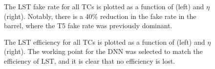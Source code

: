 \begin{figure}[!htb]
    \centering
    \qquad
    \caption{
        The LST fake rate for all TCs is plotted as a function of \pt (left) and $\eta$ (right).
        Notably, there is a 40\% reduction in the fake rate in the barrel, where the T5 fake rate was previously dominant.
    }
  \label{fig:t5dnn_fkr}
\end{figure}

\begin{figure}[!htb]
    \centering
    \qquad
    \caption{
        The LST efficiency for all TCs is plotted as a function of \pt (left) and $\eta$ (right).
        The working point for the DNN was selected to match the efficiency of LST, and it is clear that no efficiency is lost.
    }
    \label{fig:t5dnn_eff}
\end{figure}


